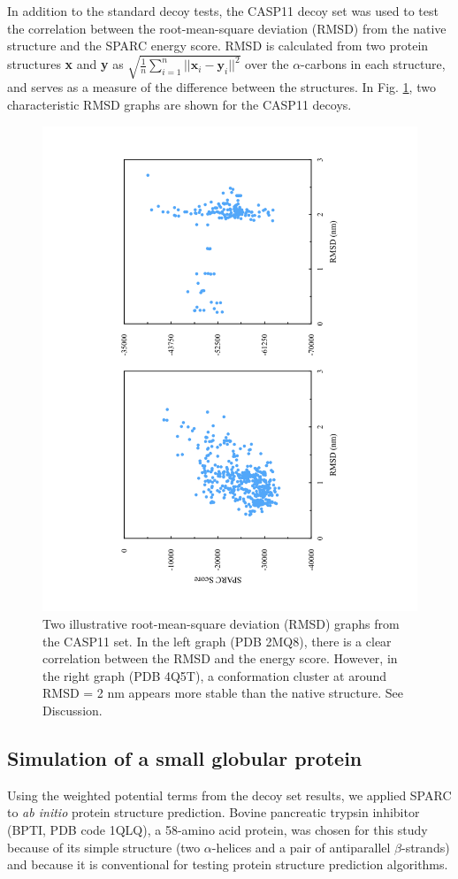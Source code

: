 \documentclass[11pt,titlepage]{article}
\begin{document}
In addition to the standard decoy tests, the CASP11 decoy set was used to test the correlation between the root-mean-square deviation (RMSD) from the native structure and the SPARC energy score.
RMSD is calculated from two protein structures \textbf{x} and \textbf{y} as $\sqrt{\frac{1}{n}\sum_{i=1}^{n}||\textbf{x}_i - \textbf{y}_i||^2}$ over the $\alpha$-carbons in each structure, and serves as a measure of the difference between the structures.
In Fig. \ref{rms_graphs}, two characteristic RMSD graphs are shown for the CASP11 decoys.

\begin{figure}
	\begin{center}
	\includegraphics[height=0.8\textwidth, angle=-90, trim=5cm 0 5cm 0]{rmsd_graph}
	\end{center}
	\caption{Two illustrative root-mean-square deviation (RMSD) graphs from the CASP11 set. In the left graph (PDB 2MQ8), there is a clear correlation between the RMSD and the energy score. However, in the right graph (PDB 4Q5T), a conformation cluster at around RMSD = 2 nm appears more stable than the native structure. See Discussion.}
	\label{rms_graphs}
\end{figure}

\subsection{Simulation of a small globular protein}
Using the weighted potential terms from the decoy set results, we applied SPARC to \textit{ab initio} protein structure prediction.
Bovine pancreatic trypsin inhibitor (BPTI, PDB code 1QLQ), a 58-amino acid protein, was chosen for this study because of its simple structure (two $\alpha$-helices and a pair of antiparallel $\beta$-strands) and because it is conventional for testing protein structure prediction algorithms.
\end{document}
